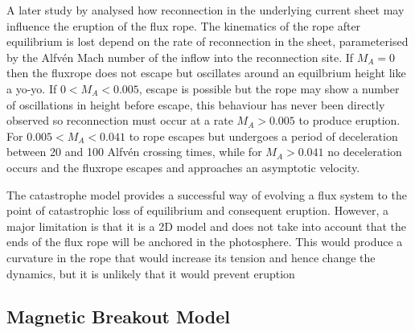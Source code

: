 A later study by \citet{priest2000} analysed how reconnection in the underlying current sheet may influence the eruption of the flux rope. The kinematics of the rope after equilibrium is lost depend on the rate of reconnection in the sheet, parameterised by the Alfv\'{e}n Mach number of the inflow into the reconnection site. If $M_A=0$ then the fluxrope does not escape but oscillates around an equilbrium height like a yo-yo. If $0<M_A<0.005$, escape is possible but the rope may show a number of oscillations in height before escape, this behaviour has never been directly observed so reconnection must occur at a rate $M_A>0.005$ to produce eruption.  For $0.005<M_A<0.041$ to rope escapes but undergoes a period of deceleration between 20 and 100 Alfv\'{e}n crossing times, while for $M_A > 0.041$ no deceleration occurs and the fluxrope escapes and approaches an asymptotic velocity.

The catastrophe model provides a successful way of evolving a flux system to the point of catastrophic loss of equilibrium and consequent eruption. However, a major limitation is that it is a 2D model and does not take into account that the ends of the flux rope will be anchored in the photosphere. This would produce a curvature in the rope that would increase its tension and hence change the dynamics, but it is unlikely that it would prevent eruption \citep{steele1989}




\subsection{Magnetic Breakout Model}\label{sec:21}

